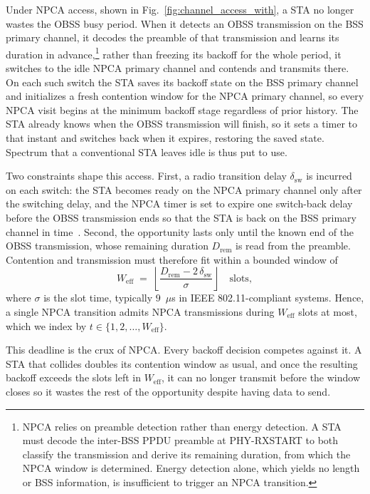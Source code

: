 \documentclass[journal,10pt]{IEEEtran}
\begin{document}
Under NPCA access, shown in Fig.~\ref{fig:channel_access_with}, a STA no longer wastes the OBSS busy period. When it detects an OBSS transmission on the BSS primary channel, it decodes the preamble of that transmission and learns its duration in advance,\footnote{NPCA relies on preamble detection rather than energy detection. A STA must decode the inter-BSS PPDU preamble at PHY-RXSTART to both classify the transmission and derive its remaining duration, from which the NPCA window is determined. Energy detection alone, which yields no length or BSS information, is insufficient to trigger an NPCA transition.} rather than freezing its backoff for the whole period, it switches to the idle NPCA primary channel and contends and transmits there. On each such switch the STA saves its backoff state on the BSS primary channel and initializes a fresh contention window for the NPCA primary channel, so every NPCA visit begins at the minimum backoff stage regardless of prior history. The STA already knows when the OBSS transmission will finish, so it sets a timer to that instant and switches back when it expires, restoring the saved state. Spectrum that a conventional STA leaves idle is thus put to use.

Two constraints shape this access. First, a radio transition delay $\delta_\mathrm{sw}$ is incurred on each switch: the STA becomes ready on the NPCA primary channel only after the switching delay, and the NPCA timer is set to expire one switch-back delay before the OBSS transmission ends so that the STA is back on the BSS primary channel in time~\cite{ieee80211bn}. Second, the opportunity lasts only until the known end of the OBSS transmission, whose remaining duration $D_\mathrm{rem}$ is read from the preamble. Contention and transmission must therefore fit within a bounded window of
\begin{equation}
    W_\mathrm{eff} \;=\; \left\lfloor
    \frac{D_\mathrm{rem}-2\,\delta_\mathrm{sw}}{\sigma} \right\rfloor
    \quad\text{slots},
    \label{eq:weff}
\end{equation}
where $\sigma$ is the slot time, typically $9$~$\mu$s in IEEE 802.11-compliant systems. Hence, a single NPCA transition admits NPCA transmissions during $W_\mathrm{eff}$ slots at most, which we index by $t \in \{1, 2, \dots, W_\mathrm{eff}\}$. 

This deadline is the crux of NPCA. Every backoff decision competes against it. A STA that collides doubles its contention window as usual, and once the resulting backoff exceeds the slots left in $W_\mathrm{eff}$, it can no longer transmit before the window closes so it wastes the rest of the opportunity despite having data to send.
\end{document}

